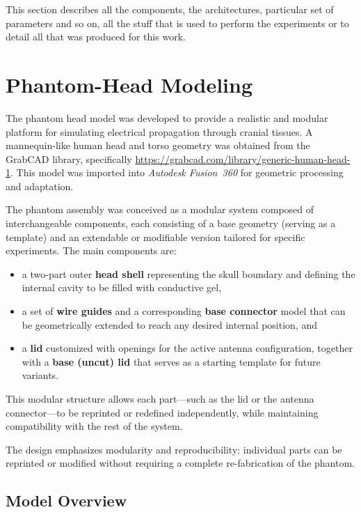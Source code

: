 \documentclass[../00_Main.tex]{subfiles}
\begin{document}
This section describes all the components, the architectures, particular set of parameters and so on, all the stuff that is used to perform the experiments or to detail all that was produced for this work.

\section{Phantom-Head Modeling}

The phantom head model was developed to provide a realistic and modular platform 
for simulating electrical propagation through cranial tissues. 
A mannequin-like human head and torso geometry was obtained from the 
GrabCAD library, specifically 
\url{https://grabcad.com/library/generic-human-head-1}. 
This model was imported into \textit{Autodesk Fusion~360} for geometric processing and adaptation.

The phantom assembly was conceived as a modular system composed of interchangeable components, 
each consisting of a base geometry (serving as a template) and an extendable or modifiable version 
tailored for specific experiments. 
The main components are:

\begin{itemize}
    \item a two-part outer \textbf{head shell} representing the skull boundary and defining the internal cavity to be filled with conductive gel,
    \item a set of \textbf{wire guides} and a corresponding \textbf{base connector} model that can be geometrically extended to reach any desired internal position, and 
    \item a \textbf{lid} customized with openings for the active antenna configuration, together with a \textbf{base (uncut) lid} that serves as a starting template for future variants.
\end{itemize}

This modular structure allows each part—such as the lid or the antenna connector—to be reprinted or redefined independently, 
while maintaining compatibility with the rest of the system.

The design emphasizes modularity and reproducibility: individual parts can be reprinted or modified 
without requiring a complete re-fabrication of the phantom.

\subsection{Model Overview}
\end{document}
